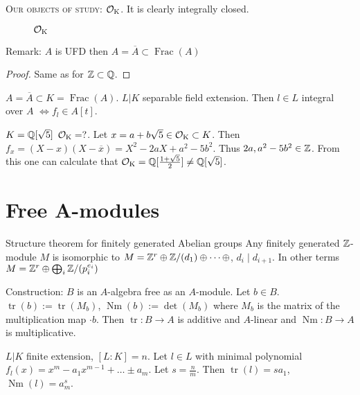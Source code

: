 \documentclass[12pt, a4paper]{article}
\DeclareMathOperator{\Frac}{Frac}
\DeclareMathOperator{\tr}{tr}
\DeclareMathOperator{\Nm}{Nm}
\begin{document}
\textsc{Our objects of study: } $\operatorname{\mathcal{O}_K}$. It is clearly integrally closed.

\begin{figure}[h]
\centering


\caption{$\operatorname{\mathcal{O}_K}$}
\end{figure}

Remark: $A$ is UFD then $A = \overline{A} \subset \Frac(A)$

\begin{proof}
	Same as for $\mathbb{Z} \subset \mathbb{Q}$.
\end{proof}

\begin{prop}{}{}
	$A = \overline{A} \subset K = \Frac(A)$. $L \vert K$ separable field 
	extension. Then $l \in L$ integral over $A$ $\iff f_l \in A[t]$. 
\end{prop}

\begin{ex}
	$K = \mathbb{Q}[\sqrt{5}]$  $\operatorname{\mathcal{O}_K} = ?$. Let $x = a + b\sqrt{5} \in \operatorname{\mathcal{O}_K} \subset K$. 
	Then $f_x = (X-x)(X-\overline{x}) = X^2 - 2aX + a^2 - 5b^2$. 
	Thus $2a, a^2 - 5b^2 \in \mathbb{Z}$. From this one can calculate that 
	$\operatorname{\mathcal{O}_K} = \mathbb{Q}[\frac{1 + \sqrt{5}}{2}] \neq \mathbb{Q}[\sqrt{5}]$.
\end{ex}

\section{Free A-modules}

\begin{thm}{Structure theorem for finitely generated Abelian groups}{}
	Any finitely generated $\mathbb{Z}$-module $M$ is isomorphic to $M = \mathbb{Z}^r \oplus 
	\mathbb{Z}/(d_1) \oplus \dots \oplus$, $d_i \mid d_{i+1}$. In other terms 
	$M = \mathbb{Z}^r \oplus \bigoplus_i \mathbb{Z}/(p_i^{e_i})$
\end{thm}

\noindent Construction: $B$ is an $A$-algebra free as an $A$-module. 
Let $b \in B$. 
$\tr(b) := \tr(M_b)$, $\Nm(b):=\det(M_b)$ where $M_b$ is the matrix of the multiplication 
map $\cdot b$. Then $\tr: B \to A$ is additive and $A$-linear and 
$\Nm: B \to A$ is multiplicative.

\begin{prop}{}{}
	$L \vert K$ finite extension, $[L:K] = n$. Let $l \in L$ 
	with minimal polynomial $f_l(x) = x^m - 
	a_1x^{m-1}+ \dots \pm a_{m}$. Let $s = \frac{n}{m}$. Then 
	$\tr(l) = sa_1$, $\Nm(l) = a_m^s$.
\end{prop}
\end{document}
